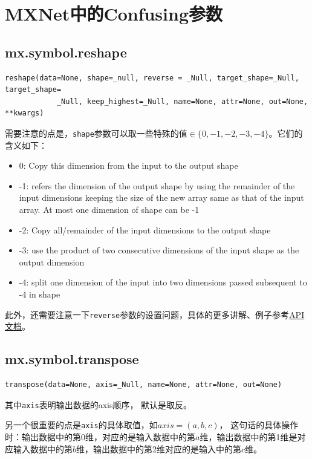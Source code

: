 \section{MXNet中的Confusing参数}

\subsection{mx.symbol.reshape}

\begin{verbatim}
reshape(data=None, shape=_null, reverse = _Null, target_shape=_Null, target_shape=
            _Null, keep_highest=_Null, name=None, attr=None, out=None, **kwargs)
\end{verbatim}

需要注意的点是，\verb|shape|参数可以取一些特殊的值$\in \{0, -1, -2, -3, -4\}$。它们的含义如下：
\begin{itemize}
\item 0: Copy this dimension from the input to the output shape
\item -1: refers the dimension of the output shape by using the remainder of the input dimensions keeping the size of the new array same as that of the input array. At most one dimension of shape can be -1
\item -2: Copy all/remainder of the input dimensions to the output shape
\item -3: use the product of two consecutive dimensions of the input shape as the output dimension
\item -4: split one dimension of the input into two dimensions passed subsequent to -4 in shape
\end{itemize}

此外，还需要注意一下\verb|reverse|参数的设置问题，具体的更多讲解、例子参考\href{https://mxnet.incubator.apache.org/api/python/symbol/symbol.html?highlight=reshape#mxnet.symbol.reshape}{API文档}。


\subsection{mx.symbol.transpose}

\begin{verbatim}
transpose(data=None, axis=_Null, name=None, attr=None, out=None)
\end{verbatim}

其中\verb|axis|表明输出数据的axis顺序， 默认是取反。

另一个很重要的点是\verb|axis|的具体取值，如$axis=(a, b, c)$， 这句话的具体操作时：输出数据中的第0维，对应的是输入数据中的第$a$维，输出数据中的第1维是对应输入数据中的第$b$维，输出数据中的第2维对应的是输入中的第$c$维。

